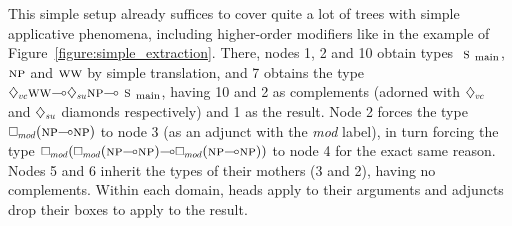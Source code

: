 This simple setup already suffices to cover quite a lot of trees with simple applicative phenomena, including higher-order modifiers like in the example of Figure~\ref{figure:simple_extraction}.
There, nodes 1, 2 and 10 obtain types $\smain[s]$, $\np[s]$ and $\ww[s]$ by simple translation, and 7 obtains the type $\ddia{vc}\ww[s]\li\ddia{su}\np[s]\li\smain[s]$, having 10 and 2 as complements (adorned with $\ddia{vc}$ and $\ddia{su}$ diamonds respectively) and 1 as the result.
Node 2 forces the type $\dbox{mod}(\np[s]\li\np[s])$ to node 3 (as an adjunct with the \textit{mod} label), in turn forcing the type $\dbox{mod}(\dbox{mod}(\np[s]\li\np[s])\li\dbox{mod}(\np[s]\li\np[s]))$ to node 4 for the exact same reason. 
Nodes 5 and 6 inherit the types of their mothers (3 and 2), having no complements.
Within each domain, heads apply to their arguments and adjuncts drop their boxes to apply to the result.

